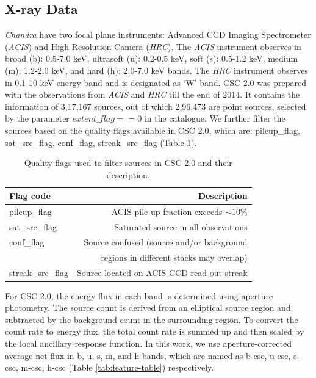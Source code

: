 \documentclass[fleqn,usenatbib]{mnras}
\begin{document}
\subsection{X-ray Data}\label{sec:x-ray-data}
{\em Chandra} have two focal plane instruments: Advanced CCD Imaging Spectrometer ({\em ACIS}) and High Resolution Camera ({\em HRC}). The {\em ACIS} instrument observes in broad (b): 0.5-7.0 keV, ultrasoft (u): 0.2-0.5 keV, soft (s): 0.5-1.2 keV, medium (m): 1.2-2.0 keV, and hard (h): 2.0-7.0 keV bands. The {\em HRC} instrument observes in 0.1-10 keV energy band and is designated as `W' band. 
CSC 2.0 was prepared with the observations from {\em ACIS} and {\em HRC} till the end of 2014. It contains the information of 3,17,167 sources, out of which 2,96,473 are point sources, selected by the parameter $extent\_flag==0$ in the catalogue. We further filter the sources based on the quality flags available in CSC 2.0, which are: pileup\_flag, sat\_src\_flag, conf\_flag, streak\_src\_flag (Table \ref{tab:flag-table}).
\begin{table}
	\centering
	\caption{Quality flags used to filter sources in CSC 2.0 and their description.}
	\label{tab:flag-table}
        \begin{tabular}{lr}
        \hline
        \textbf{Flag code}         & \textbf{Description}                                            \\ \hline
        pileup\_flag      & ACIS pile-up fraction exceeds $\sim$10\%  \\
        sat\_src\_flag    & Saturated source in all observations \\
        conf\_flag        & Source confused (source and/or background \\ 
                          & regions in different stacks may overlap) \\
        streak\_src\_flag & Source located on ACIS CCD read-out streak                  \\ \hline
        \end{tabular}
\end{table}

 For CSC 2.0, the energy flux in each band is determined using aperture photometry. The source count is derived from an elliptical source region and subtracted by the background count in the surrounding region. To convert the count rate to energy flux, the total count rate is summed up and then scaled by the local ancillary response function. In this work, we use aperture-corrected average net-flux in b, u, s, m, and h bands, which are named as b-csc, u-csc, s-csc, m-csc, h-csc (Table \ref{tab:feature-table}) respectively. 
\end{document}
